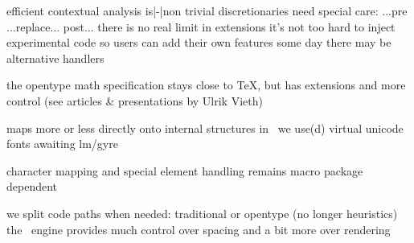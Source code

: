\stopsubject

\startsubject[title={remarks}]

    \startitemize
        \startitem
            efficient contextual analysis is|-|non trivial
        \stopitem
        \startitem
            discretionaries need special care: ...pre ...replace... post...
        \stopitem
        \startitem
            there is no real limit in extensions
        \stopitem
        \startitem
            it's not too hard to inject experimental code
        \stopitem
        \startitem
            so users can add their own features
        \stopitem
        \startitem
            some day there may be alternative handlers
        \stopitem
    \stopitemize

\stopsubject

\stoptitle

\starttitle[title={math}]

\startsubject[title={format}]

    the opentype math specification stays close to \TeX, but has extensions and
    more control (see articles & presentations by Ulrik Vieth)

\stopsubject

\startsubject[title={loading}]

    \startitemize
        \startitem
            maps more or less directly onto internal structures
        \stopitem
        \startitem
            in \ConTeXt\ we use(d) virtual unicode fonts awaiting lm/gyre
        \stopitem
    \stopitemize

\stopsubject

\startsubject[title={processing}]

    character mapping and special element handling remains macro package
    dependent

\stopsubject

\startsubject[title={construction}]

    \startitemize
        \startitem
            we split code paths when needed: traditional or opentype (no longer
            heuristics)
        \stopitem
        \startitem
            the \luaTeX\ engine provides much control over spacing and a bit more
            over rendering
        \stopitem
    \stopitemize

\stopsubject

\stoptitle

\starttitle[title={the basics of loading}]

\startsubject[title={the format}]

